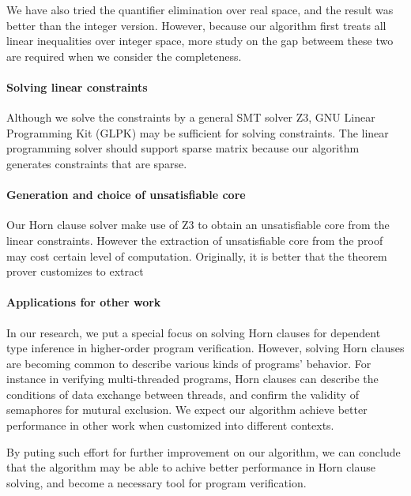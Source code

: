 We have also tried the quantifier elimination over real space, and the
result was better than the integer version.  However, because our algorithm
first treats all linear inequalities over integer space, more study on
the gap betweem these two are required when we consider the completeness.

\paragraph{Solving linear constraints}

Although we solve the constraints by a general SMT solver Z3, GNU
Linear Programming Kit (GLPK) may be sufficient for solving
constraints.  The linear programming solver should support sparse
matrix because our algorithm generates constraints that are sparse.


\paragraph{Generation and choice of unsatisfiable core}
Our Horn clause solver make use of Z3 to obtain an unsatisfiable core
from the linear constraints.  However the extraction of unsatisfiable
core from the proof may cost certain level of computation.
Originally, it is better that the theorem prover customizes to extract



\paragraph{Applications for other work}
In our research, we put a special focus on solving Horn clauses for
dependent type inference in higher-order program verification.
However, solving Horn clauses are becoming common to describe various
kinds of programs' behavior. For instance in verifying multi-threaded
programs, Horn clauses can describe the conditions of data exchange
between threads, and confirm the validity of semaphores for mutural
exclusion.  We expect our algorithm achieve better performance in
other work when customized into different contexts.

By puting such effort for further improvement on our algorithm, we can
conclude that the algorithm may be able to achive better performance
in Horn clause solving, and become a necessary tool for program verification.
